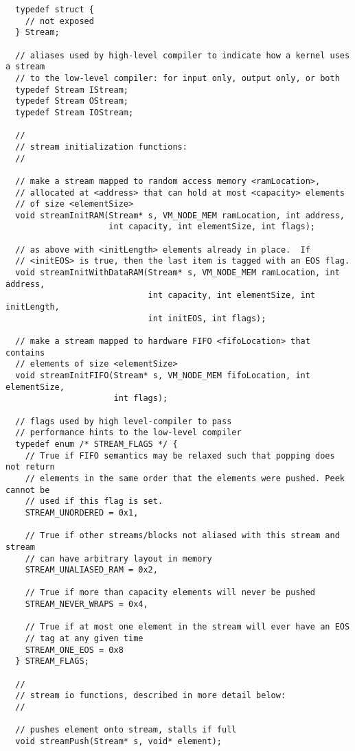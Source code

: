 {\small
\begin{verbatim}
  typedef struct {
    // not exposed
  } Stream;

  // aliases used by high-level compiler to indicate how a kernel uses a stream
  // to the low-level compiler: for input only, output only, or both
  typedef Stream IStream;
  typedef Stream OStream;
  typedef Stream IOStream;
 
  //
  // stream initialization functions:
  //
  
  // make a stream mapped to random access memory <ramLocation>, 
  // allocated at <address> that can hold at most <capacity> elements
  // of size <elementSize>
  void streamInitRAM(Stream* s, VM_NODE_MEM ramLocation, int address, 
                     int capacity, int elementSize, int flags); 
 
  // as above with <initLength> elements already in place.  If 
  // <initEOS> is true, then the last item is tagged with an EOS flag.
  void streamInitWithDataRAM(Stream* s, VM_NODE_MEM ramLocation, int address, 
                             int capacity, int elementSize, int initLength, 
                             int initEOS, int flags);

  // make a stream mapped to hardware FIFO <fifoLocation> that contains
  // elements of size <elementSize>
  void streamInitFIFO(Stream* s, VM_NODE_MEM fifoLocation, int elementSize,
                      int flags);

  // flags used by high level-compiler to pass 
  // performance hints to the low-level compiler
  typedef enum /* STREAM_FLAGS */ {
    // True if FIFO semantics may be relaxed such that popping does not return   
    // elements in the same order that the elements were pushed. Peek cannot be
    // used if this flag is set.
    STREAM_UNORDERED = 0x1,

    // True if other streams/blocks not aliased with this stream and stream 
    // can have arbitrary layout in memory
    STREAM_UNALIASED_RAM = 0x2,
    
    // True if more than capacity elements will never be pushed
    STREAM_NEVER_WRAPS = 0x4,

    // True if at most one element in the stream will ever have an EOS
    // tag at any given time
    STREAM_ONE_EOS = 0x8
  } STREAM_FLAGS;  

  //
  // stream io functions, described in more detail below:
  //
  
  // pushes element onto stream, stalls if full
  void streamPush(Stream* s, void* element);
  

\end{verbatim}}
